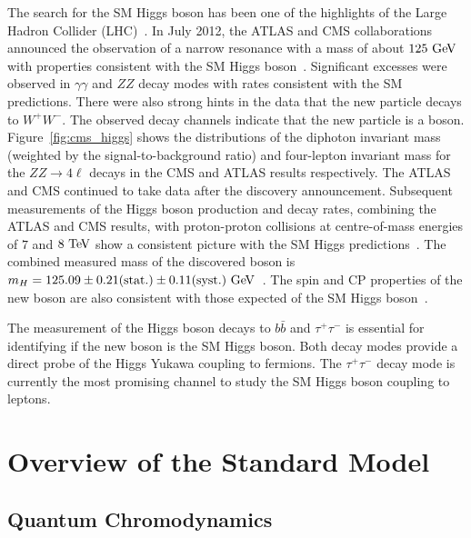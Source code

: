 The search for the SM Higgs boson has been one of the highlights of the Large Hadron Collider (LHC)~\cite{1748-0221-3-08-S08001}. In July 2012, the ATLAS and CMS collaborations announced the observation of a narrow resonance with a mass of about $125~\mathrm{Ge\kern -0.1em V}$ with properties consistent with the SM Higgs boson~\cite{Aad:2012tfa,Chatrchyan:2012xdj}. Significant excesses were observed in $\gamma\gamma$ and $ZZ$ decay modes with rates consistent with the SM predictions. There were also strong hints in the data that the new particle decays to $W^+W^-$. The observed decay channels indicate that the new particle is a boson. Figure~\ref{fig:cms_higgs} shows the distributions of the diphoton invariant mass (weighted by the signal-to-background ratio) and four-lepton invariant mass for the $ZZ \rightarrow 4\ell$ decays in the CMS and ATLAS results respectively. The ATLAS and CMS continued to take data after the discovery announcement. Subsequent measurements of the Higgs boson production and decay rates, combining the ATLAS and CMS results, with proton-proton collisions at centre-of-mass energies of $7$ and $8~\mathrm{Te\kern -0.1em V}$ show a consistent picture with the SM Higgs predictions~\cite{Khachatryan:2016vau}. The combined measured mass of the discovered boson is $m_{H}=125.09 \pm 0.21 \mathrm{(stat.)} \pm 0.11 \mathrm{(syst.)}~\mathrm{Ge\kern -0.1em V}$~\cite{Aad:2015zhl}. The spin and CP properties of the new boson are also consistent with those expected of the SM Higgs boson~\cite{Chatrchyan:2012jja,Aad:2013xqa,Khachatryan:2014kca}.

The measurement of the Higgs boson decays to $b\bar{b}$ and $\tau^{+}\tau^{-}$ is essential for identifying if the new boson is the SM Higgs boson. Both decay modes provide a direct probe of the Higgs Yukawa coupling to fermions. The $\tau^{+}\tau^{-}$ decay mode is currently the most promising channel to study the SM Higgs boson coupling to leptons.

\section{Overview of the Standard Model}

\subsection{Quantum Chromodynamics}

